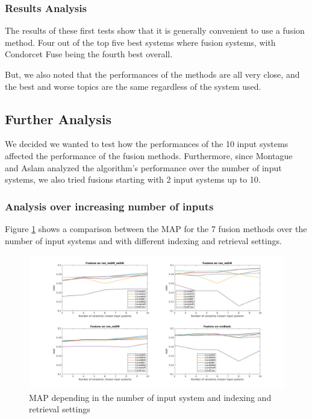 {	\subsubsection{Results Analysis}
	The results of these first tests show that it is generally convenient to use a fusion method.
	Four out of the top five best systems where fusion systems, with Condorcet Fuse being the fourth best overall.
	
	But, we also noted that the performances of the methods are all very close, and the best and worse topics are the same regardless of the system used.
	
	\subsection{Further Analysis}
	We decided we wanted to test how the performances of the 10 input systems affected the performance of the fusion methods.
	Furthermore, since Montague and Aslam \cite{3} analyzed the algorithm's performance over the number of input systems, we also tried fusions starting with 2 input systems up to 10.
	
	\subsubsection{Analysis over increasing number of inputs}	
	Figure \ref{fig:4x4comp} shows a comparison between the MAP for the 7 fusion methods over the number of input systems and with different indexing and retrieval settings.
	
	\begin{figure}[h]
		\centering				
		\includegraphics[width=\linewidth]{../eval/results-img-graphs/4x4comp.jpg}
		\caption{MAP depending in the number of input system and indexing and retrieval settings}				
		\label{fig:4x4comp}					
	\end{figure}

}

